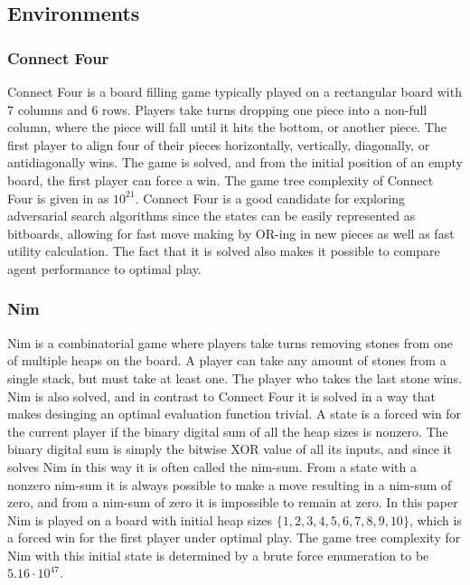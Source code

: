 \subsection{Environments}

\subsubsection{Connect Four}
Connect Four is a board filling game typically played on a rectangular board with $7$ columns and $6$ rows. Players take turns dropping one piece into a non-full column, where the piece will fall until it hits the bottom, or another piece. The first player to align four of their pieces horizontally, vertically, diagonally, or antidiagonally wins. The game is solved, and from the initial position of an empty board, the first player can force a win. The game tree complexity of Connect Four is given in \cite{Allis1994} as $10^{21}$. Connect Four is a good candidate for exploring adversarial search algorithms since the states can be easily represented as bitboards, allowing for fast move making by OR-ing in new pieces as well as fast utility calculation. The fact that it is solved also makes it possible to compare agent performance to optimal play.

\subsubsection{Nim}
Nim is a combinatorial game where players take turns removing stones from one of multiple heaps on the board. A player can take any amount of stones from a single stack, but must take at least one. The player who takes the last stone wins. Nim is also solved, and in contrast to Connect Four it is solved in a way that makes desinging an optimal evaluation function trivial. A state is a forced win for the current player if the binary digital sum of all the heap sizes is nonzero. The binary digital sum is simply the bitwise XOR value of all its inputs, and since it solves Nim in this way it is often called the nim-sum. From a state with a nonzero nim-sum it is always possible to make a move resulting in a nim-sum of zero, and from a nim-sum of zero it is impossible to remain at zero. In this paper Nim is played on a board with initial heap sizes $\{1, 2, 3, 4, 5, 6, 7, 8, 9, 10\}$, which is a forced win for the first player under optimal play. The game tree complexity for Nim with this initial state is determined by a brute force enumeration to be $5.16 \cdot 10^{47}$.

